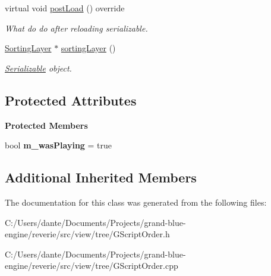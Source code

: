 \begin{Indent}
\begin{DoxyCompactItemize}
\mbox{\label{classrev_1_1_view_1_1_script_json_widget_ad2d70f558c512c29ba513088b9264680}} 
virtual void \mbox{\hyperlink{classrev_1_1_view_1_1_script_json_widget_ad2d70f558c512c29ba513088b9264680}{post\+Load}} () override
\begin{DoxyCompactList}\small\item\em What do do after reloading serializable. \end{DoxyCompactList}\item 
\mbox{\label{classrev_1_1_view_1_1_script_json_widget_a6cf25944030e65200a68308be1ab6f46}} 
\mbox{\hyperlink{structrev_1_1_sorting_layer}{Sorting\+Layer}} $\ast$ \mbox{\hyperlink{classrev_1_1_view_1_1_script_json_widget_a6cf25944030e65200a68308be1ab6f46}{sorting\+Layer}} ()
\begin{DoxyCompactList}\small\item\em \mbox{\hyperlink{classrev_1_1_serializable}{Serializable}} object. \end{DoxyCompactList}\end{DoxyCompactItemize}
\end{Indent}
\subsection*{Protected Attributes}
\begin{Indent}\textbf{ Protected Members}\par
\begin{DoxyCompactItemize}
\item 
\mbox{\label{classrev_1_1_view_1_1_script_json_widget_abb6e981b6862a16f98e40e37b6d6d33a}} 
bool {\bfseries m\+\_\+was\+Playing} = true
\end{DoxyCompactItemize}
\end{Indent}
\subsection*{Additional Inherited Members}


The documentation for this class was generated from the following files\+:\begin{DoxyCompactItemize}
\item 
C\+:/\+Users/dante/\+Documents/\+Projects/grand-\/blue-\/engine/reverie/src/view/tree/G\+Script\+Order.\+h\item 
C\+:/\+Users/dante/\+Documents/\+Projects/grand-\/blue-\/engine/reverie/src/view/tree/G\+Script\+Order.\+cpp\end{DoxyCompactItemize}
